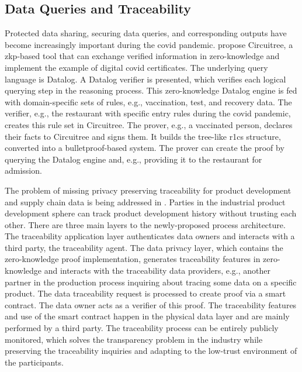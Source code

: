 \subsection{Data Queries and Traceability}
Protected data sharing, securing data queries, and corresponding outputs have become increasingly important during the \acrshort{covid} pandemic. \citet{Godden} propose Circuitree, a \acrshort{zkp}-based tool that can exchange verified information in zero-knowledge and implement the example of digital \acrshort{covid} certificates. The underlying query language is Datalog. A Datalog verifier is presented, which verifies each logical querying step in the reasoning process. This zero-knowledge Datalog engine is fed with domain-specific sets of rules, e.g., vaccination, test, and recovery data. The verifier, e.g., the restaurant with specific entry rules during the \acrshort{covid} pandemic, creates this rule set in Circuitree. The prover, e.g., a vaccinated person, declares their facts to Circuitree and signs them. It builds the tree-like \acrshort{r1cs} structure, converted into a bulletproof-based system. The prover can create the proof by querying the Datalog engine and, e.g., providing it to the restaurant for admission.

The problem of missing privacy preserving traceability for product development and supply chain data is being addressed in \citet{XueWang}. Parties in the industrial product development sphere can track product development history without trusting each other. There are three main layers to the newly-proposed process architecture. The traceability application layer authenticates data owners and interacts with a third party, the traceability agent. The data privacy layer, which contains the zero-knowledge proof implementation, generates traceability features in zero-knowledge and interacts with the traceability data providers, e.g., another partner in the production process inquiring about tracing some data on a specific product. The data traceability request is processed to create proof via a smart contract. The data owner acts as a verifier of this proof. The traceability features and use of the smart contract happen in the physical data layer and are mainly performed by a third party. The traceability process can be entirely publicly monitored, which solves the transparency problem in the industry while preserving the traceability inquiries and adapting to the low-trust environment of the participants.

